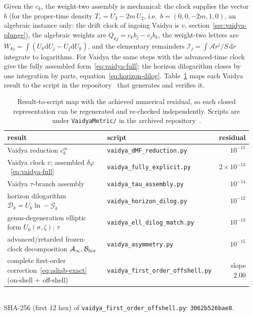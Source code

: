 \documentclass[12pt]{iopart}
\newcommand{\dd}{\mathrm{d}}
\theoremstyle{plain}
\theoremstyle{definition}
\theoremstyle{plain}
\theoremstyle{remark}
\begin{document}
Given the $c_k$, the weight-two assembly is mechanical: the clock supplies the vector
$b$ (for the proper-time density $T_\tau=U_3-2m\,U_2$, i.e.\ $b=(0,0,-2m,1,0)$, an
algebraic instance only: the drift clock of ingoing Vaidya is $v$, section~\ref{sec:vaidya-plunge}), the algebraic
weights are $Q_{kj}=c_kb_j-c_jb_k$, the weight-two
letters are $W_{kj}=\int(U_k\dd U_j-U_j\dd U_k)$, and the elementary remainders
$\mathcal{I}_j=\int\mathcal{A}r^j/S\,\dd r$ integrate to logarithms. For Vaidya the
same steps with the advanced-time clock give the fully assembled
form~\eqref{eq:vaidya-full}; the horizon dilogarithm closes by one integration by
parts, equation~\eqref{eq:horizon-dilog}. Table~\ref{tab:script-map} maps each Vaidya result to
the script in the repository~\cite{Rosignoli2026CodeJMP} that generates and verifies it.
\begin{table}[htbp]
    \centering
    \caption{Result-to-script map with the achieved numerical residual, so each closed
    representation can be regenerated and re-checked independently. Scripts are under
    \texttt{VaidyaMetric/} in the archived repository~\cite{Rosignoli2026CodeJMP}.}
    \label{tab:script-map}
    \small
    \begin{tabular}{@{}p{}>{\raggedright\arraybackslash}p{}r@{}}
        \hline\hline
        result & script & residual\\
        \hline
        Vaidya reduction $c_k^m$
            & \texttt{vaidya\_dMF\_reduction.py} & $10^{-15}$\\
        Vaidya clock $v$; assembled $\delta\varphi$~\eqref{eq:vaidya-full}
            & \texttt{vaidya\_fully\_explicit.py} & $2\times10^{-13}$\\
        Vaidya $\tau$-branch assembly
            & \texttt{vaidya\_tau\_assembly.py} & $10^{-14}$\\
        horizon dilogarithm $\mathcal{D}_k=U_k\ln-\mathcal{G}_k$
            & \texttt{vaidya\_horizon\_dilog.py} & $10^{-12}$\\
        genus-degeneration elliptic form $U_0(\sigma,\zeta)$; $\tau$
            & \texttt{vaidya\_ell\_dilog\_match.py} & $10^{-13}$\\
        advanced/retarded frozen-clock decomposition $\mathcal{A}_\infty,\mathcal{B}_{\rm hor}$
            & \texttt{vaidya\_asymmetry.py} & $10^{-15}$\\
        complete first-order correction~\eqref{eq:adiab-exact} (on-shell $+$ off-shell)
            & \texttt{vaidya\_first\_\allowbreak order\_\allowbreak offshell.py} & slope $2.00$\\
        \hline\hline
    \end{tabular}
    \\[2pt]
    {\footnotesize SHA-256 (first 12 hex) of
    \texttt{vaidya\_first\_order\_offshell.py}: \texttt{3062b526bae8}.}
\end{table}
\end{document}
